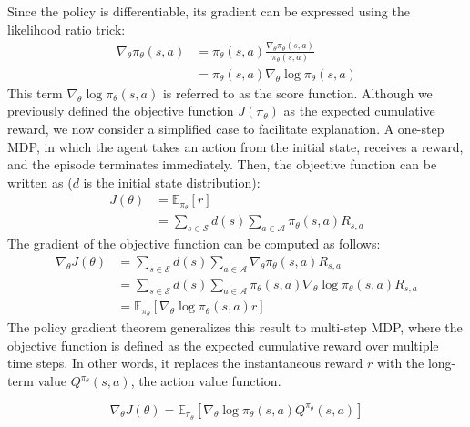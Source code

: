 Since the policy is differentiable, its gradient can be expressed using the likelihood ratio trick:
\begin{equation}
  \begin{aligned}
    \nabla_\theta \pi_\theta(s, a)
    &= \pi_\theta(s, a) \frac{\nabla_\theta \pi_\theta(s, a)}{\pi_\theta(s, a)} \\
    &= \pi_\theta(s, a) \nabla_\theta \log \pi_\theta(s, a)
  \end{aligned}
\end{equation}
This term $\nabla_\theta \log \pi_\theta(s, a)$ is referred to as the score function.
Although we previously defined the objective function $J(\pi_\theta)$ as the expected cumulative reward, we now consider a simplified case to facilitate explanation.
A one-step MDP, in which the agent takes an action from the initial state, receives a reward, and the episode terminates immediately.
Then, the objective function can be written as ($d$ is the initial state distribution):
\begin{equation}
  \begin{aligned}
    J(\theta)
    &= \mathbb{E}_{\pi_\theta}[r] \\
    &= \sum_{s \in \mathcal{S}} d(s) \sum_{a \in \mathcal{A}} \pi_\theta(s, a) R_{s ,a}
  \end{aligned}
\end{equation}
The gradient of the objective function can be computed as follows:
\begin{equation}
  \begin{aligned}
    \nabla_\theta J(\theta)
    &= \sum_{s \in \mathcal{S}} d(s) \sum_{a \in \mathcal{A}} \nabla_\theta \pi_\theta(s, a) R_{s, a} \\
    &= \sum_{s \in \mathcal{S}} d(s) \sum_{a \in \mathcal{A}} \pi_\theta(s, a) \nabla_\theta \log \pi_\theta(s, a) R_{s, a} \\
    &= \mathbb{E}_{\pi_\theta} [\nabla_\theta \log \pi_\theta(s, a) r]
  \end{aligned}
\end{equation}
The policy gradient theorem generalizes this result to multi-step MDP, where the objective function is defined as the expected cumulative reward over multiple time steps.
In other words, it replaces the instantaneous reward $r$ with the long-term value $Q^{\pi_\theta} (s, a)$, the action value function.
\begin{theorem} \label{chap2:thm:pg}
  \begin{equation}
    \nabla_\theta J(\theta) = \mathbb{E}_{\pi_\theta} [\nabla_\theta \log \pi_\theta(s, a) Q^{\pi_\theta}(s, a)]
  \end{equation}
\end{theorem}

